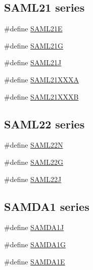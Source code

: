 \subsection*{S\+A\+M\+L21 series}
\begin{DoxyCompactItemize}
\item 
\#define \mbox{\hyperlink{group__sam__part__macros__group_ga77d426bf473440074718db9179864325}{S\+A\+M\+L21E}}
\item 
\#define \mbox{\hyperlink{group__sam__part__macros__group_ga81494be96e002472b9a552c8cf261db0}{S\+A\+M\+L21G}}
\item 
\#define \mbox{\hyperlink{group__sam__part__macros__group_gab33eded948f0cd289b45cf2570ace7e1}{S\+A\+M\+L21J}}
\item 
\#define \mbox{\hyperlink{group__sam__part__macros__group_ga133675be48c6539ee10945bd9577a99e}{S\+A\+M\+L21\+X\+X\+XA}}
\item 
\#define \mbox{\hyperlink{group__sam__part__macros__group_ga8f1ce40088d4f4a65fe4e9c9f6785043}{S\+A\+M\+L21\+X\+X\+XB}}
\end{DoxyCompactItemize}
\subsection*{S\+A\+M\+L22 series}
\begin{DoxyCompactItemize}
\item 
\#define \mbox{\hyperlink{group__sam__part__macros__group_gacacfa44cd4e08d409f47b21091d37d7b}{S\+A\+M\+L22N}}
\item 
\#define \mbox{\hyperlink{group__sam__part__macros__group_gab57f0f43cbe78f536576e04c9b237785}{S\+A\+M\+L22G}}
\item 
\#define \mbox{\hyperlink{group__sam__part__macros__group_ga88e5b2e7925ad798e0e6d099be6ac52d}{S\+A\+M\+L22J}}
\end{DoxyCompactItemize}
\subsection*{S\+A\+M\+D\+A1 series}
\begin{DoxyCompactItemize}
\item 
\#define \mbox{\hyperlink{group__sam__part__macros__group_gac5ecd62910ae8097510c6b9be6fdc422}{S\+A\+M\+D\+A1J}}
\item 
\#define \mbox{\hyperlink{group__sam__part__macros__group_ga50dbce5f439ee5e0228cfd1982793627}{S\+A\+M\+D\+A1G}}
\item 
\#define \mbox{\hyperlink{group__sam__part__macros__group_gab3c006df6e9b5866427a0df88b253351}{S\+A\+M\+D\+A1E}}
\end{DoxyCompactItemize}
